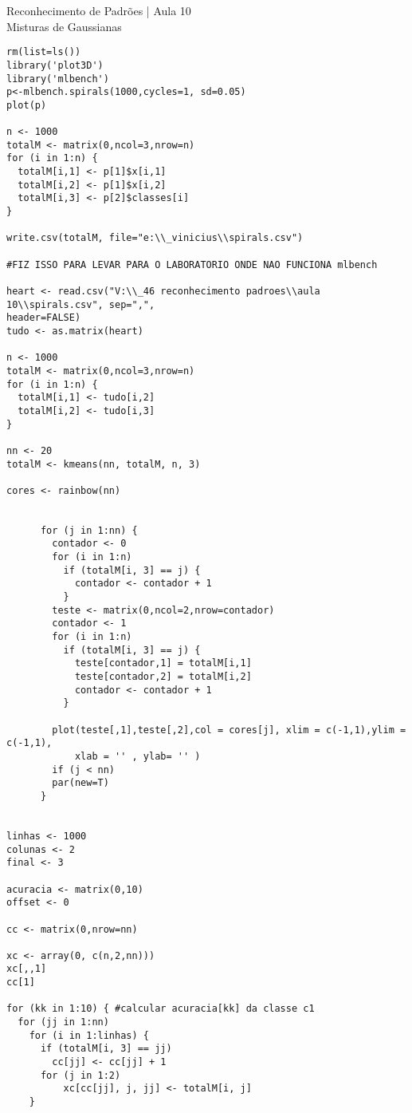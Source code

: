 \documentclass[12pt]{article}
\begin{document}
\Large

\begin{center}
Reconhecimento de Padr\~oes | Aula 10 \\
Misturas de Gaussianas
\end{center}

\normalsize

\begin{verbatim}
rm(list=ls())
library('plot3D')
library('mlbench')
p<-mlbench.spirals(1000,cycles=1, sd=0.05)
plot(p)

n <- 1000
totalM <- matrix(0,ncol=3,nrow=n)
for (i in 1:n) {
  totalM[i,1] <- p[1]$x[i,1]
  totalM[i,2] <- p[1]$x[i,2]
  totalM[i,3] <- p[2]$classes[i]
}

write.csv(totalM, file="e:\\_vinicius\\spirals.csv")

#FIZ ISSO PARA LEVAR PARA O LABORATORIO ONDE NAO FUNCIONA mlbench

heart <- read.csv("V:\\_46 reconhecimento padroes\\aula 10\\spirals.csv", sep=",",
header=FALSE)
tudo <- as.matrix(heart)

n <- 1000
totalM <- matrix(0,ncol=3,nrow=n)
for (i in 1:n) {
  totalM[i,1] <- tudo[i,2]
  totalM[i,2] <- tudo[i,3]
}

nn <- 20
totalM <- kmeans(nn, totalM, n, 3)

cores <- rainbow(nn)


	  for (j in 1:nn) {
	    contador <- 0
	    for (i in 1:n)
	      if (totalM[i, 3] == j) {
	        contador <- contador + 1
	      }
	    teste <- matrix(0,ncol=2,nrow=contador)
	    contador <- 1
	    for (i in 1:n)
	      if (totalM[i, 3] == j) {
	        teste[contador,1] = totalM[i,1]
	        teste[contador,2] = totalM[i,2]
	        contador <- contador + 1
	      }

	    plot(teste[,1],teste[,2],col = cores[j], xlim = c(-1,1),ylim = c(-1,1),
    	    xlab = '' , ylab= '' )
	    if (j < nn)
  	    par(new=T)
	  }


linhas <- 1000
colunas <- 2
final <- 3

acuracia <- matrix(0,10)
offset <- 0

cc <- matrix(0,nrow=nn)

xc <- array(0, c(n,2,nn)))
xc[,,1]
cc[1]

for (kk in 1:10) { #calcular acuracia[kk] da classe c1
  for (jj in 1:nn)
    for (i in 1:linhas) {
      if (totalM[i, 3] == jj)
        cc[jj] <- cc[jj] + 1
      for (j in 1:2)
          xc[cc[jj], j, jj] <- totalM[i, j]
    }


\end{verbatim}
\end{document}
